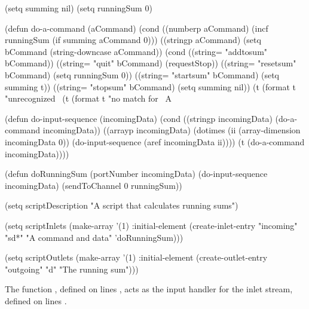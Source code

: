 \begin{listing}[5]{1}
(setq summing nil)
(setq runningSum 0)

(defun do-a-command (aCommand)
  (cond ((numberp aCommand)
	 (incf runningSum (if summing aCommand 0)))
	((stringp aCommand)
	 (setq bCommand (string-downcase aCommand))
	 (cond ((string= "addtosum" bCommand))
	       ((string= "quit" bCommand) (requestStop))
	       ((string= "resetsum" bCommand) (setq runningSum 0))
	       ((string= "startsum" bCommand) (setq summing t))
	       ((string= "stopsum" bCommand) (setq summing nil))
	       (t (format t "unrecognized~%
	(t (format t "no match for ~A~%

(defun do-input-sequence (incomingData)
  (cond
   ((stringp incomingData)
    (do-a-command incomingData))
   ((arrayp incomingData)
    (dotimes (ii (array-dimension incomingData 0))
      (do-input-sequence (aref incomingData ii))))
   (t (do-a-command incomingData))))

(defun doRunningSum (portNumber incomingData)
  (do-input-sequence incomingData)
  (sendToChannel 0 runningSum))

(setq scriptDescription "A script that calculates running sums")

(setq scriptInlets (make-array '(1) :initial-element
			       (create-inlet-entry "incoming" "sd*" "A command and data"
						   'doRunningSum)))

(setq scriptOutlets (make-array '(1) :initial-element
				(create-outlet-entry "outgoing" "d" "The running sum")))
\end{listing}
\codeEnd{}
The function , defined on lines \longDash{},
acts as the input handler for the inlet stream, defined on lines
\longDash{}.\\

